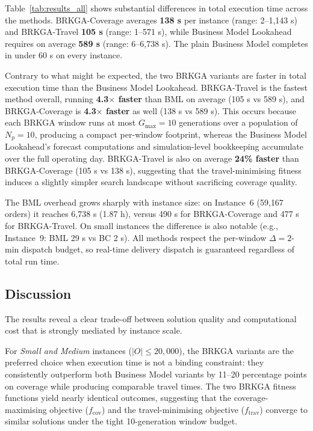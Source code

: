 Table~\ref{tab:results_all} shows substantial differences in
total execution time across the methods.
BRKGA-Coverage averages \textbf{138 s} per instance
(range: 2--1{,}143 s) and BRKGA-Travel \textbf{105 s}
(range: 1--571 s), while Business Model Lookahead requires
on average \textbf{589 s} (range: 6--6{,}738 s).
The plain Business Model completes in under 60 s on every instance.

Contrary to what might be expected, the two BRKGA variants are
faster in total execution time than the Business Model Lookahead.
BRKGA-Travel is the fastest method overall, running
\textbf{4.3$\times$ faster} than BML on average (105 s vs 589 s),
and BRKGA-Coverage is \textbf{4.3$\times$ faster} as well (138 s vs 589 s).
This occurs because each BRKGA window runs at most $G_{\max}=10$
generations over a population of $N_p=10$, producing a compact
per-window footprint, whereas the Business Model Lookahead's
forecast computations and simulation-level bookkeeping accumulate
over the full operating day.
BRKGA-Travel is also on average \textbf{24\% faster} than
BRKGA-Coverage (105 s vs 138 s), suggesting that the
travel-minimising fitness induces a slightly simpler search
landscape without sacrificing coverage quality.

The BML overhead grows sharply with instance size:
on Instance~6 (59{,}167 orders) it reaches 6{,}738 s (1.87 h),
versus 490 s for BRKGA-Coverage and 477 s for BRKGA-Travel.
On small instances the difference is also notable
(e.g., Instance~9: BML 29 s vs BC 2 s).
All methods respect the per-window $\Delta = 2$-min dispatch
budget, so real-time delivery dispatch is guaranteed regardless
of total run time.

\subsection{Discussion}\label{subsec:discussion}

The results reveal a clear trade-off between solution quality and
computational cost that is strongly mediated by instance scale.

For \emph{Small and Medium} instances ($|O| \leq 20{,}000$),
the BRKGA variants are the preferred choice when execution time
is not a binding constraint: they consistently outperform both
Business Model variants by 11--20 percentage points on coverage
while producing comparable travel times.
The two BRKGA fitness functions yield nearly identical outcomes,
suggesting that the coverage-maximising objective ($f_{\text{cov}}$)
and the travel-minimising objective ($f_{\text{trav}}$) converge
to similar solutions under the tight 10-generation window budget.

